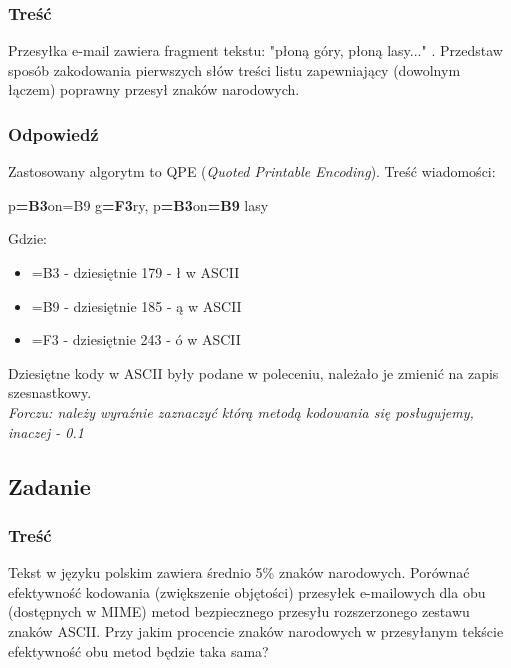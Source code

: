 \documentclass[a4paper,twoside]{article}
\begin{document}
\subsubsection{Treść}
Przesyłka e-mail zawiera fragment tekstu: "płoną góry, płoną lasy..." . Przedstaw sposób zakodowania pierwszych słów treści listu zapewniający (dowolnym łączem) poprawny przesył znaków narodowych.
\subsubsection{Odpowiedź}
Zastosowany algorytm to QPE (\emph{Quoted Printable Encoding}). Treść wiadomości:
\begin{center}
	p\textbf{=B3}on=B9 g\textbf{=F3}ry, p\textbf{=B3}on\textbf{=B9} lasy
\end{center}
Gdzie:
\begin{itemize}
	\item =B3 - dziesiętnie 179 - ł w ASCII
	\item =B9 - dziesiętnie 185 - ą w ASCII
	\item =F3 - dziesiętnie 243 - ó w ASCII
\end{itemize}
Dziesiętne kody w ASCII były podane w poleceniu, należało je zmienić na zapis szesnastkowy.\\
{\small \emph{Forczu: należy wyraźnie zaznaczyć którą metodą kodowania się posługujemy, inaczej - 0.1}}
\subsection{Zadanie}
\subsubsection{Treść}
Tekst w języku polskim zawiera średnio 5\% znaków narodowych. Porównać efektywność kodowania (zwiększenie objętości) przesyłek e-mailowych dla obu (dostępnych w MIME) metod bezpiecznego przesyłu rozszerzonego zestawu znaków ASCII. Przy jakim procencie znaków narodowych w przesyłanym tekście efektywność obu metod będzie taka sama?
\end{document}
